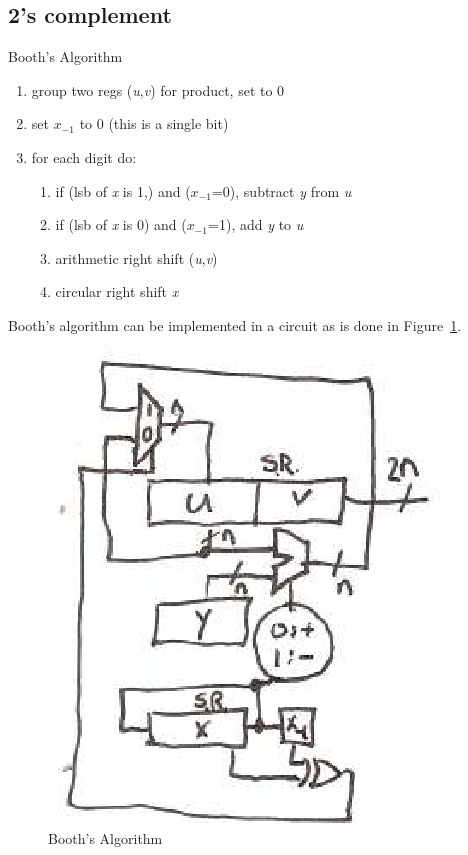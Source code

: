 \subsection{2's complement}

Booth's Algorithm
\begin{enumerate}
    \item group two regs (\emph{u},\emph{v}) for product, set to 0
    \item set \emph{$x_{-1}$} to 0 (this is a single bit)
    \item for each digit do:
    \begin{enumerate}
        \item if (lsb of \emph{x} is 1,) and (\emph{$x_{-1}$}=0), subtract \emph{y} from \emph{u}
        \item if (lsb of \emph{x} is 0) and (\emph{$x_{-1}$}=1), add \emph{y} to \emph{u}
        \item arithmetic right shift (\emph{u},\emph{v})
        \item circular right shift \emph{x}
    \end{enumerate}
\end{enumerate}

Booth's algorithm can be implemented in a circuit as is done in Figure~\ref{f-booths}.

\begin{figure}
\caption{Booth's Algorithm}\label{f-booths}
\begin{center}
\includegraphics{booths.eps}
\end{center}
\end{figure}


